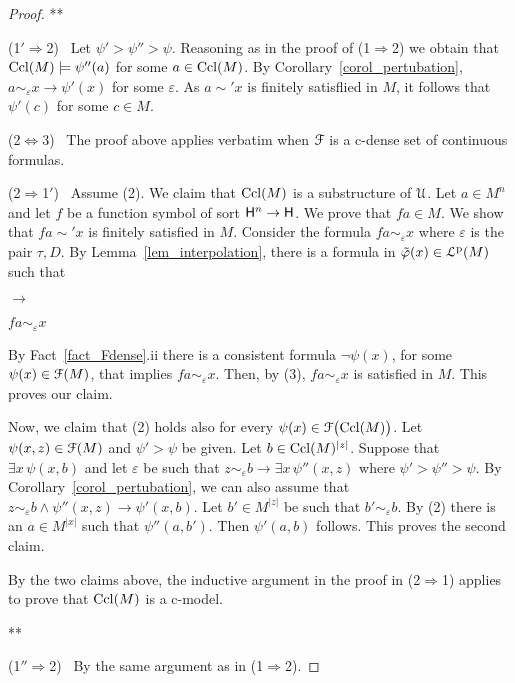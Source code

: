 \documentclass{amsproc}
\begin{document}
{\begin{proof}
\hfil***

  (1$'\!\Rightarrow$2) \ 
  Let $\psi'>\psi''>\psi$.
  Reasoning as in the proof of (1$\Rightarrow$2) we obtain that ${\rm Ccl}(M)\models\psi''(a)$ for some $a\in{\rm Ccl}(M)$.
  By Corollary~\ref{corol_pertubation}, $a\sim_\varepsilon\! x\rightarrow\psi'(x)$ for some $\varepsilon$.
  As $a\sim'x$ is finitely satisflied in $M$, it follows that $\psi'(c)$ for some $c\in M$.

  (2$\Leftrightarrow$3) \ 
  The proof above applies verbatim when ${\EuScript F}$ is a c-dense set of continuous formulas.
  
  (2$\Rightarrow$1$'$) \ 
  Assume (2).
  We claim that ${\rm Ccl}(M)$ is a substructure of ${\EuScript U}$.  
  Let $a\in M^{n}$ and let $f$ be a function symbol of sort ${\sf H}^{n}\to{\sf H}$.
  We prove that $fa\in M$.
  We show that $fa\sim' x$ is finitely satisfied in $M$.
  Consider the formula $fa\sim_\varepsilon\!  x$ where $\varepsilon$ is the pair $\tau,D$.
  By Lemma~\ref{lem_interpolation}, there is a formula in $\tilde\varphi(x)\in{\EuScript L}^{\rm p}(M)$ such that
  
  \ceq{\hfill fa\sim_\tau x}{\rightarrow}{\neg\tilde\varphi(x)}\parbox{6ex}{\hfil$\rightarrow$}$fa\sim_\varepsilon\!  x$

  By Fact~\ref{fact_Fdense}.ii there is a consistent formula  $\neg\psi(x)$, for some $\psi(x)\in{\EuScript F}(M)$, that implies $fa\sim_\varepsilon\!  x$.
  Then, by (3), $fa\sim_\varepsilon\!  x$ is satisfied in $M$.
  This proves our claim.

  Now, we claim that (2) holds also for every $\psi(x)\in{\EuScript F}\big({\rm Ccl}(M)\big)$.
  Let $\psi(x,z)\in{\EuScript F}(M)$ and $\psi'>\psi$ be given.
  Let $b\in{\rm Ccl}(M)^{|z|}$.
  Suppose that $\exists x\,\psi(x,b)$ and let $\varepsilon$ be such that $z\sim_\varepsilon\! b\rightarrow\exists x\,\psi''(x,z)$ where $\psi'>\psi''>\psi$.
  By Corollary~\ref{corol_pertubation}, we can also assume that $z\sim_\varepsilon\! b\wedge\psi''(x,z)\rightarrow\psi'(x,b)$. 
  Let $b'\in M^{|z|}$ be such that $b'\sim_\varepsilon\! b$.
  By (2) there is an $a\in M^{|x|}$ such that $\psi''(a,b')$.
  Then $\psi'(a,b)$ follows.
  This proves the second claim.

  By the two claims above, the inductive argument in the proof in (2$\Rightarrow$1) applies to prove that ${\rm Ccl}(M)$ is a c-model.

  \hfil***

  (1$''\!\Rightarrow$2) \ 
  By the same argument as in (1$\Rightarrow$2).



\end{proof}}
\end{document}
